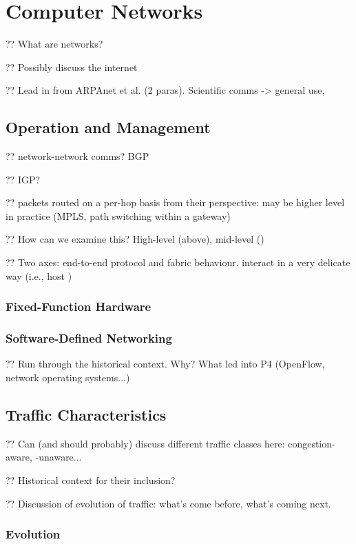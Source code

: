 \chapter{Computer Networks}

?? What are networks?

?? Possibly discuss the internet

?? Lead in from ARPAnet et al. (2 paras). Scientific comms -> general use,

\section{Operation and Management}

?? network-network comms? BGP

?? IGP?

?? packets routed on a per-hop basis from their perspective: may be higher level in practice (MPLS, path switching within a gateway)

?? How can we examine this? High-level (above), mid-level ()

?? Two axes: end-to-end protocol and fabric behaviour. interact in a very delicate way (i.e., host )

\subsection{Fixed-Function Hardware}

\subsection{Software-Defined Networking}

?? Run through the historical context. Why? What led into P4 (OpenFlow, network operating systems...)

\section{Traffic Characteristics}

?? Can (and should probably) discuss different traffic classes here: congestion-aware, -unaware...

?? Historical context for their inclusion?

?? Discussion of evolution of traffic: what's come before, what's coming next.

\subsection{Evolution}

